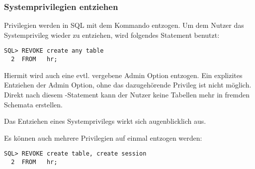         \subsubsection{Systemprivilegien entziehen}
          Privilegien werden in SQL mit dem Kommando 
          entzogen. Um dem Nutzer  das Systemprivileg
           wieder zu entziehen, wird folgendes
          Statement benutzt:
          \begin{lstlisting}[caption={Entziehen eines
          Privileges},label=admin232,language=oracle_sql]
SQL> REVOKE create any table
  2  FROM   hr;
          \end{lstlisting}
          Hiermit wird auch eine evtl. vergebene Admin Option entzogen. Ein explizites Entziehen der Admin Option, ohne das dazugeh\"orende Privileg ist nicht m\"oglich. Direkt nach diesem -Statement kann der Nutzer  keine Tabellen mehr in fremden Schemata erstellen.
          \begin{merke}
            Das Entziehen eines Systemprivilegs wirkt sich augenblicklich aus.
          \end{merke}
          Es k\"onnen auch mehrere Privilegien auf einmal entzogen werden:
          \begin{lstlisting}[caption={Entziehen mehrerer
          Privilegien},label=admin234,language=oracle_sql]
SQL> REVOKE create table, create session
  2  FROM   hr;
          \end{lstlisting}
